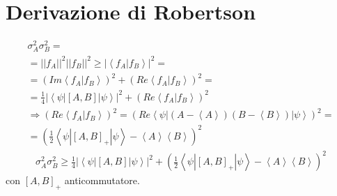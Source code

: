 \section{Derivazione di Robertson} %
\begin{equation}\begin{split}
\sigma_A^2\sigma_B^2= \\
=||f_A||^2||f_B||^2\ge |\left\langle f_A|f_B \right\rangle |^2= \\
=\left(Im\left\langle f_A|f_B \right\rangle\right)^2+\left(Re\left\langle f_A|f_B \right\rangle\right)^2= \\
=\frac{1}{4}|\left\langle \psi |\left[A,B\right]|\psi  \right\rangle|^2+\left(Re\left\langle f_A|f_B \right\rangle\right)^2 \\
\Longrightarrow \left(Re\left\langle f_A|f_B \right\rangle\right)^2=\left(Re\left\langle \psi |\left(A-\left\langle A \right\rangle\right)\left(B-\left\langle B \right\rangle\right)|\psi  \right\rangle\right)^2= \\
=\left(\frac{1}{2}\left\langle \psi |\left[A,B\right]_+|\psi  \right\rangle-\left\langle A \right\rangle\left\langle B \right\rangle\right)^2
\end{split}\end{equation}
\begin{equation}\begin{split}
\sigma_A^2\sigma_B^2\ge \frac{1}{4}|\left\langle \psi |\left[A,B\right]|\psi  \right\rangle|^2+\left(\frac{1}{2}\left\langle \psi |\left[A,B\right]_+|\psi  \right\rangle-\left\langle A \right\rangle\left\langle B \right\rangle\right)^2
\end{split}\end{equation}
con $\left[A,B\right]_+$ anticommutatore.